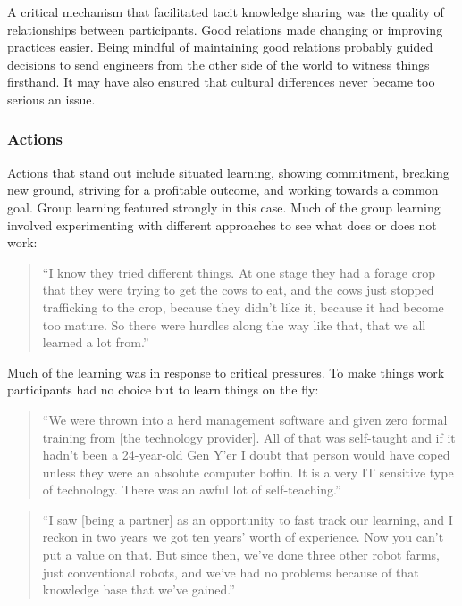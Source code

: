 A critical mechanism that facilitated tacit knowledge sharing was the quality of relationships between participants. Good relations made changing or improving practices easier. Being mindful of maintaining good relations probably guided decisions to send engineers from the other side of the world to witness things firsthand. It may have also ensured that cultural differences never became too serious an issue. 

\subsubsection{Actions}

Actions that stand out include situated learning, showing commitment, breaking new ground, striving for a profitable outcome, and working towards a common goal. Group learning featured strongly in this case. Much of the group learning involved experimenting with different approaches to see what does or does not work:

\begin{quote}
\small
\enquote{I know they tried different things. At one stage they had a forage crop that they were trying to get the cows to eat, and the cows just stopped trafficking to the crop, because they didn't like it, because it had become too mature. So there were hurdles along the way like that, that we all learned a lot from.} \\
\end{quote}

Much of the learning was in response to critical pressures. To make things work participants had no choice but to learn things on the fly:

\begin{quote}
\small
\enquote{We were thrown into a herd management software and given zero formal training from [the technology provider]. All of that was self-taught and if it hadn't been a 24-year-old Gen Y'er I doubt that person would have coped unless they were an absolute computer boffin. It is a very IT sensitive type of technology. There was an awful lot of self-teaching.} \\
\end{quote}

\begin{quote}
\small
\enquote{I saw [being a partner] as an opportunity to fast track our learning, and I reckon in two years we got ten years' worth of experience. Now you can't put a value on that. But since then, we've done three other robot farms, just conventional robots, and we've had no problems because of that knowledge base that we've gained.} \\
\end{quote}


